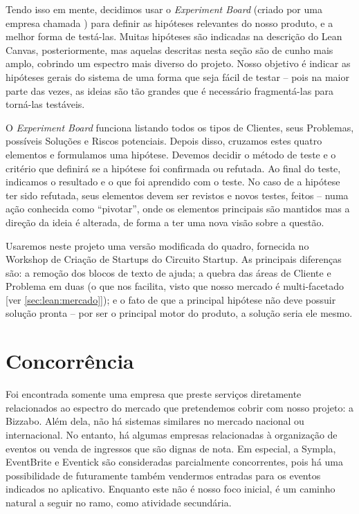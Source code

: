 \documentclass[12pt,a4paper,twoside,hyphens,english,brazil]{abntex2}
\begin{document}
Tendo isso em mente, decidimos usar o \emph{Experiment Board} (criado por uma empresa chamada ) para definir as hipóteses relevantes do nosso produto, e a melhor forma de testá-las. Muitas hipóteses são indicadas na descrição do Lean Canvas, posteriormente, mas aquelas descritas nesta seção são de cunho mais amplo, cobrindo um espectro mais diverso do projeto. Nosso objetivo é indicar as hipóteses gerais do sistema de uma forma que seja fácil de testar -- pois na maior parte das vezes, as ideias são tão grandes que é necessário fragmentá-las para torná-las testáveis\cite{experiment-board-post}.

O \emph{Experiment Board} funciona listando todos os tipos de Clientes, seus Problemas, possíveis Soluções e Riscos potenciais. Depois disso, cruzamos estes quatro elementos e formulamos uma hipótese. Devemos decidir o método de teste e o critério que definirá se a hipótese foi confirmada ou refutada. Ao final do teste, indicamos o resultado e o que foi aprendido com o teste. No caso de a hipótese ter sido refutada, seus elementos devem ser revistos e novos testes, feitos -- numa ação conhecida como ``pivotar'', onde os elementos principais são mantidos mas a direção da ideia é alterada, de forma a ter uma nova visão sobre a questão.

Usaremos neste projeto uma versão modificada do quadro, fornecida no Workshop de Criação de Startups do Circuito Startup\cite{workshop-startup}. As principais diferenças são: a remoção dos blocos de texto de ajuda; a quebra das áreas de Cliente e Problema em duas (o que nos facilita, visto que nosso mercado é multi-facetado [ver \autoref{sec:lean:mercado}]); e o fato de que a principal hipótese não deve possuir solução pronta -- por ser o principal motor do produto, a solução seria ele mesmo.




\section{Concorrência}
Foi encontrada somente uma empresa que preste serviços diretamente relacionados ao espectro do mercado que pretendemos cobrir com nosso projeto: a Bizzabo. Além dela, não há sistemas similares no mercado nacional ou internacional. No entanto, há algumas empresas relacionadas à organização de eventos ou venda de ingressos que são dignas de nota. Em especial, a Sympla, EventBrite e Eventick são consideradas parcialmente concorrentes, pois há uma possibilidade de futuramente também vendermos entradas para os eventos indicados no aplicativo. Enquanto este não é nosso foco inicial, é um caminho natural a seguir no ramo, como atividade secundária.
\end{document}
